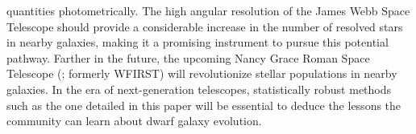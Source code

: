 \documentclass[ms.tex]{subfiles}
\begin{document}
quantities photometrically.
The high angular resolution of the James Webb Space Telescope
\citep[JWST;][]{Gardner2006} should provide a considerable increase in the
number of resolved stars in nearby galaxies, making it a promising instrument
to pursue this potential pathway.
Farther in the future, the upcoming Nancy Grace Roman Space Telescope
(\citealp{Spergel2013, Spergel2015}; formerly WFIRST) will revolutionize
stellar populations in nearby galaxies.
In the era of next-generation telescopes, statistically robust methods such as
the one detailed in this paper will be essential to deduce the lessons the
community can learn about dwarf galaxy evolution.
\end{document}
